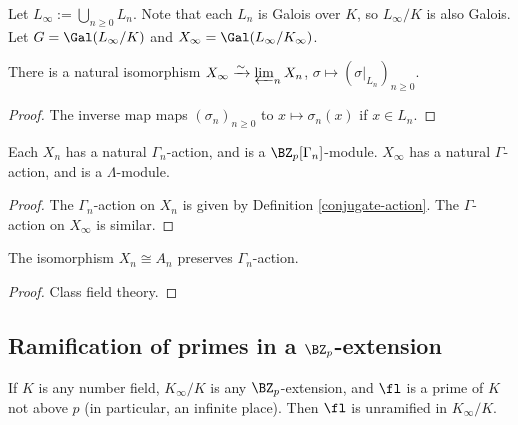 \begin{definition}
\label{Zp-ext-L-inf}
Let $L_\infty:=\bigcup_{n\geq 0}L_n$.
Note that each $L_n$ is Galois over $K$, so $L_\infty/K$ is also Galois.
Let $G=\Gal(L_\infty/K)$ and $X_\infty=\Gal(L_\infty/K_\infty)$.
\end{definition}

\begin{lem}
\label{X-inf-is-proj-lim}
There is a natural isomorphism $X_\infty\xrightarrow{\sim}\varprojlim_n X_n$,
$\sigma\mapsto(\sigma|_{L_n})_{n\geq 0}$.
\end{lem}

\begin{proof}
The inverse map maps $(\sigma_n)_{n\geq 0}$
to $x\mapsto\sigma_n(x)$ if $x\in L_n$.
\end{proof}

\begin{lem}
\label{X-has-Gamma-action}
Each $X_n$ has a natural $\Gamma_n$-action, and is a $\BZ_p[\Gamma_n]$-module.
$X_\infty$ has a natural $\Gamma$-action, and is a $\Lambda$-module.
\end{lem}

\begin{proof}
The $\Gamma_n$-action on $X_n$ is given by
Definition \ref{conjugate-action}.
The $\Gamma$-action on $X_\infty$ is similar.
\end{proof}

\begin{prop}
\label{Xn-isom-An-equivariant}
The isomorphism $X_n\cong A_n$ preserves $\Gamma_n$-action.
\end{prop}

\begin{proof}
Class field theory.
\end{proof}

\subsection{Ramification of primes in a $\BZ_p$-extension}

\begin{prop}
\label{p:unr-outside-p}
If $K$ is any number field, $K_\infty/K$ is any $\BZ_p$-extension,
and $\fl$ is a prime of $K$ not above $p$
(in particular, an infinite place).
Then $\fl$ is unramified in $K_\infty/K$.
\end{prop}


